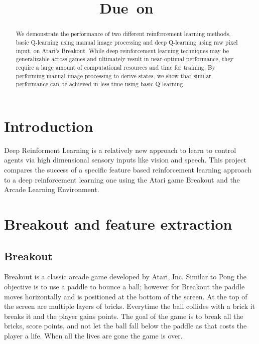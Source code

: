 \documentclass{article}
\title{
    \vspace{2in}
    \textmd{\textbf{\hmwkTitle}}\\
    \normalsize\vspace{0.1in}\small{Due\ on\ \hmwkDueDate}\\
    \vspace{0.1in}\large{\textit{\hmwkClassInstructor}}
    \vspace{3in}
}
\author{\textbf{\hmwkAuthorName}}
\date{}
\begin{document}
\maketitle

\pagebreak

\begin{abstract}
We demonstrate the performance of two different reinforcement learning methods, basic Q-learning using manual image processing and deep Q-learning using raw pixel input, on Atari's Breakout.  While deep reinforcement learning techniques may be generalizable across games and ultimately result in near-optimal performance, they require a large amount of computational resources and time for training.  By performing manual image processing to derive states, we show that similar performance can be achieved in less time using basic Q-learning.
\end{abstract}

\section{Introduction}
Deep Reinforment Learning is a relatively new approach to learn to control agents via high dimensional sensory inputs like vision and speech. This project compares the success of a specific feature based reinforcement learning approach to a deep reinforcement learning one using the Atari game Breakout and the Arcade Learning Environment.

\section{Breakout and feature extraction}
\subsection{Breakout}
Breakout is a classic arcade game developed by Atari, Inc. Similar to Pong the objective is to use a paddle to bounce a ball; however for Breakout the paddle moves horizontally and is positioned at the bottom of the screen. At the top of the screen are multiple layers of bricks. Everytime the ball collides with a brick it breaks it and the player gains points. The goal of the game is to break all the bricks, score points, and not let the ball fall below the paddle as that costs the player a life. When all the lives are gone the game is over. \\
\end{document}
